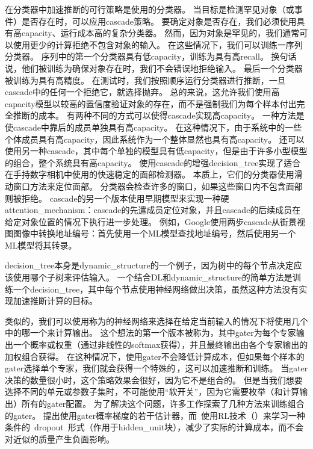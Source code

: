 在分类器中加速推断的可行策略是使用的分类器。
当目标是检测罕见对象（或事件）是否存在时，可以应用\gls{cascade}策略。
要确定对象是否存在，我们必须使用具有高\gls{capacity}、运行成本高的复杂分类器。 
然而，因为对象是罕见的，我们通常可以使用更少的计算拒绝不包含对象的输入。
在这些情况下，我们可以训练一序列分类器。
序列中的第一个分类器具有低\gls{capacity}，训练为具有高\gls{recall}。
换句话说，他们被训练为确保对象存在时，我们不会错误地拒绝输入。
最后一个分类器被训练为具有高精度。
在测试时，我们按照顺序运行分类器进行推断，一旦\gls{cascade}中的任何一个拒绝它，就选择抛弃。
总的来说，这允许我们使用高\gls{capacity}模型以较高的置信度验证对象的存在，而不是强制我们为每个样本付出完全推断的成本。
有两种不同的方式可以使得\gls{cascade}实现高\gls{capacity}。
一种方法是使\gls{cascade}中靠后的成员单独具有高\gls{capacity}。
在这种情况下，由于系统中的一些个体成员具有高\gls{capacity}，因此系统作为一个整体显然也具有高\gls{capacity}。
还可以使用另一种\gls{cascade}，其中每个单独的模型具有低\gls{capacity}，但是由于许多小型模型的组合，整个系统具有高\gls{capacity}。
\citet{Viola01}使用\gls{cascade}的增强\gls{decision_tree}实现了适合在手持数字相机中使用的快速稳定的面部检测器。
本质上，它们的分类器使用滑动窗口方法来定位面部。
分类器会检查许多的窗口，如果这些窗口内不包含面部则被拒绝。
\gls{cascade}的另一个版本使用早期模型来实现一种硬\gls{attention_mechanism}：\gls{cascade}的先遣成员定位对象，并且\gls{cascade}的后续成员在给定对象位置的情况下执行进一步处理。
例如，Google使用两步\gls{cascade}从街景视图图像中转换地址编号：首先使用一个\gls{ML}模型查找地址编号，然后使用另一个\gls{ML}模型将其转录\citep{Goodfellow+et+al-ICLR2014a}。

\gls{decision_tree}本身是\gls{dynamic_structure}的一个例子，因为树中的每个节点决定应该使用哪个子树来评估输入。
一个结合\gls{DL}和\gls{dynamic_structure}的简单方法是训练一个\gls{decision_tree}，其中每个节点使用神经网络做出决策\citep{guo1992classification}，虽然这种方法没有实现加速推断计算的目标。



类似的，我们可以使用称为的神经网络来选择在给定当前输入的情况下将使用几个中的哪一个来计算输出。
这个想法的第一个版本被称为\citep{Nowlan90,Jacobs-nc91}，其中\gls{gater}为每个专家输出一个概率或权重（通过非线性的\gls{softmax}获得），并且最终输出由各个专家输出的加权组合获得。
在这种情况下，使用\gls{gater}不会降低计算成本，但如果每个样本的\gls{gater}选择单个专家，我们就会获得一个特殊的\,\citep{collobert:2001:rr01-12,collobert:2002}，这可以加速推断和训练。
当\gls{gater}决策的数量很小时，这个策略效果会很好，因为它不是组合的。
但是当我们想要选择不同的单元或参数子集时，不可能使用``软开关''，因为它需要枚举（和计算输出）所有的\gls{gater}配置。
为了解决这个问题，许多工作探索了几种方法来训练组合的\gls{gater}。
\citet{bengio2013estimating}提出使用\gls{gater}概率梯度的若干估计器，而~\citet{Bacon-et-al-RLDM2015,BengioE-et-al-arXiv2015}使用\gls{RL}技术（）来学习一种条件的~\gls{dropout}~形式（作用于\gls{hidden_unit}块），减少了实际的计算成本，而不会对近似的质量产生负面影响。


